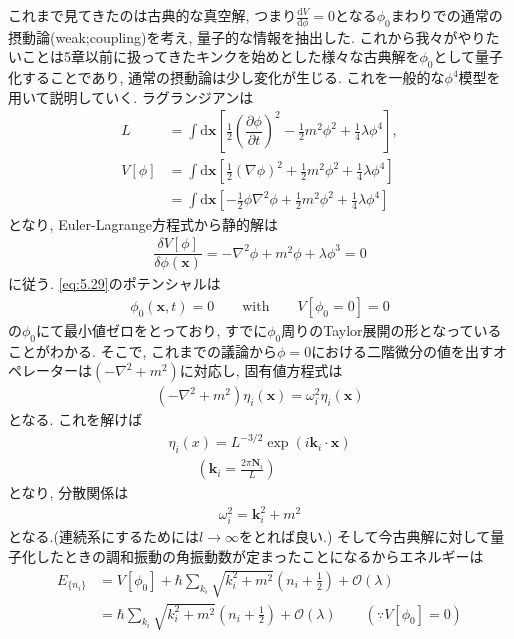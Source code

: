 \documentclass[dvipdfmx,11pt,a4paper,oneside,openany]{jsbook}
\begin{document}
これまで見てきたのは古典的な真空解, つまり$\frac{\mathrm{d}V}{\mathrm{d}\phi}=0$となる$\phi_0$まわりでの通常の摂動論(weak;coupling)を考え, 量子的な情報を抽出した. これから我々がやりたいことは5章以前に扱ってきたキンクを始めとした様々な古典解を$\phi_0$として量子化することであり, 通常の摂動論は少し変化が生じる. これを一般的な$\phi^4$模型を用いて説明していく. ラグランジアンは
\begin{align}
    L       & =\int\mathrm{d}\bm{x}\left[\frac{1}{2}\left(\dfrac{\partial \phi}{\partial t}\right)^2-\frac{1}{2}m^2\phi^2+\frac{1}{4}\lambda\phi^4\right], \\
    V[\phi] & =\int\mathrm{d}\bm{x}\left[\frac{1}{2}\left(\nabla \phi\right)^2+\frac{1}{2}m^2\phi^2+\frac{1}{4}\lambda\phi^4\right]\nonumber               \\
            & =\int\mathrm{d}\bm{x}\left[-\frac{1}{2}\phi\nabla^2\phi+\frac{1}{2}m^2\phi^2+\frac{1}{4}\lambda\phi^4\right]\label{eq:5.29}
\end{align}
となり, Euler-Lagrange方程式から静的解は
\begin{align}
    \dfrac{\delta V[\phi]}{\delta \phi(\bm{x})}=-\nabla^2\phi+m^2\phi+\lambda\phi^3=0
\end{align}
に従う. \eqref{eq:5.29}のポテンシャルは
\begin{align}
    \phi_0(\bm{x},t)=0\qquad \text{with} \qquad V[\phi_0=0]=0
\end{align}
の$\phi_0$にて最小値ゼロをとっており, すでに$\phi_0$周りのTaylor展開の形となっていることがわかる. そこで, これまでの議論から$\phi=0$における二階微分の値を出すオペレーターは$(-\nabla^2+m^2)$に対応し, 固有値方程式は
\begin{align}
    \left(-\nabla^2+m^2\right)\eta_i(\bm{x})=\omega_i^2\eta_i(\bm{x})
\end{align}
となる. これを解けば
\begin{align*}
    \eta_i(x)=L^{-3/2}\exp\left(i\bm{k}_i\cdot \bm{x}\right) \\
    \qquad \left(\bm{k}_i=\frac{2\pi\bm{N}_i}{L}\right)
\end{align*}
となり, 分散関係は
\begin{align*}
    \omega_i^2=\bm{k}_i^2+m^2
\end{align*}
となる.(連続系にするためには$l\rightarrow\infty$をとれば良い.) そして今古典解に対して量子化したときの調和振動の角振動数が定まったことになるからエネルギーは
\begin{align}
    E_{\{n_i\}} & =V[\phi_0]+\hbar\sum_{k_i}\sqrt{k_i^2+m^2}\left(n_i+\frac{1}{2}\right)+\mathcal{O}(\lambda)\nonumber                      \\
                & =\hbar\sum_{k_i}\sqrt{k_i^2+m^2}\left(n_i+\frac{1}{2}\right)+\mathcal{O}(\lambda)\qquad \left(\because V[\phi_0]=0\right)
\end{align}
\end{document}
